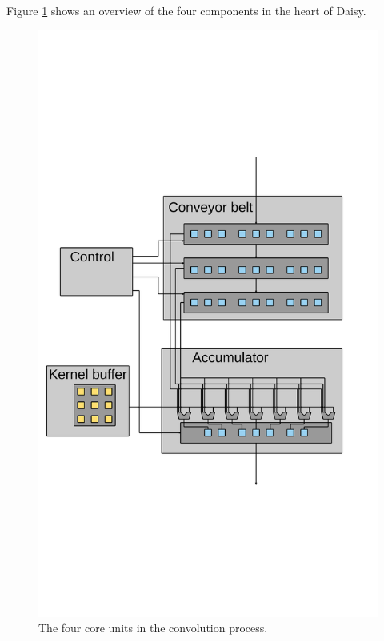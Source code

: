 Figure \ref{fig:DaisyView} shows an overview of the four components in the heart of Daisy. 

\begin{figure}[h!]
    \includegraphics[width=\linewidth]{img/DaisyOverview.png}
    \caption{The four core units in the convolution process.}
    \label{fig:DaisyView}
\end{figure}


